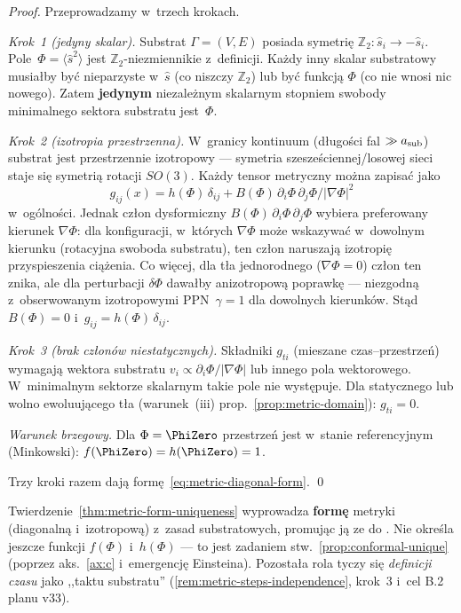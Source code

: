 \begin{proof}
Przeprowadzamy w~trzech krokach.

\emph{Krok~1 (jedyny skalar).}
Substrat $\Gamma = (V, E)$ posiada symetri\k{e}
$\mathbb{Z}_2: \hat{s}_i \to -\hat{s}_i$.
Pole~$\Phi = \langle\hat{s}^2\rangle$ jest $\mathbb{Z}_2$-niezmiennikie
z~definicji.
Ka\.zdy inny skalar substratowy musia\l{}by by\'c
nieparzyste w~$\hat{s}$ (co niszczy $\mathbb{Z}_2$)
lub by\'c funkcj\k{a} $\Phi$ (co nie wnosi nic nowego).
Zatem \textbf{jedynym} niezale\.znym skalarnym stopniem
swobody minimalnego sektora substratu jest~$\Phi$.

\emph{Krok~2 (izotropia przestrzenna).}
W~granicy kontinuum (d\l{}ugo\'sci fal $\gg a_{\rm sub}$) substrat
jest przestrzennie izotropowy --- symetria szesze\'sciennej/losowej
sieci staje si\k{e} symetri\k{a} rotacji $SO(3)$.
Ka\.zdy tensor metryczny mo\.zna zapisa\'c jako
\begin{equation}\label{eq:gij-general}
  g_{ij}(x) = h(\Phi)\,\delta_{ij}
               + B(\Phi)\,\partial_i\Phi\,\partial_j\Phi / |\nabla\Phi|^2
\end{equation}
w~og\'olno\'sci.
Jednak cz\l{}on dysformiczny $B(\Phi)\,\partial_i\Phi\,\partial_j\Phi$
wybiera preferowany kierunek $\nabla\Phi$:
dla konfiguracji, w~kt\'orych $\nabla\Phi$ mo\.ze wskazywa\'c
w~dowolnym kierunku (rotacyjna swoboda substratu), ten cz\l{}on
naruszaj\k{a} izotropi\k{e} przyspieszenia ci\k{a}\.zenia.
Co wi\k{e}cej, dla t\l{}a jednorodnego ($\nabla\Phi = 0$) cz\l{}on
ten znika, ale dla perturbacji $\delta\Phi$ dawa\l{}by
anizotropow\k{a} poprawk\k{e} ---  niezgodn\k{a} z~obserwowanym
izotropowymi PPN~$\gamma = 1$ dla dowolnych kierunk\'ow.
St\k{a}d $B(\Phi) = 0$ i~$g_{ij} = h(\Phi)\,\delta_{ij}$.

\emph{Krok~3 (brak cz\l{}on\'ow niestatycznych).}
Sk\l{}adniki $g_{ti}$ (mieszane czas--przestrze\'n) wymagaj\k{a}
wektora substratu $v_i \propto \partial_i\Phi / |\nabla\Phi|$
lub innego pola wektorowego.
W~minimalnym sektorze skalarnym takie pole nie wyst\k{e}puje.
Dla statycznego lub wolno ewoluuj\k{a}cego t\l{}a (warunek~(iii)
prop.~\ref{prop:metric-domain}): $g_{ti} = 0$.

\emph{Warunek brzegowy.}
Dla $\Phi = \PhiZero$ przestrze\'n jest w~stanie referencyjnym
(Minkowski): $f(\PhiZero) = h(\PhiZero) = 1$.

\medskip\noindent
Trzy kroki razem daj\k{a} form\k{e}~\eqref{eq:metric-diagonal-form}. \qed
\end{proof}

\begin{remark}%
\label{rem:bridge-partial}
Twierdzenie~\ref{thm:metric-form-uniqueness} wyprowadza
\textbf{form\k{e}} metryki (diagonaln\k{a} i~izotropow\k{a})
z~zasad substratowych, promuj\k{a}c j\k{a} ze
 do .
Nie okre\'sla jeszcze funkcji $f(\Phi)$ i~$h(\Phi)$ ---
to jest zadaniem stw.~\ref{prop:conformal-unique} (poprzez aks.~\ref{ax:c}
i~emergencj\k{e} Einsteina).
Pozosta\l{}a rola  tyczy si\k{e} \emph{definicji czasu}
jako ,,taktu substratu'' (\ref{rem:metric-steps-independence}, krok~3
i~cel B.2 planu v33).
\end{remark}


